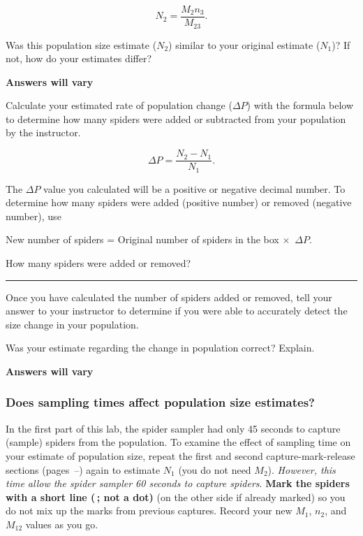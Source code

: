 \documentclass[12pt, hidelinks]{exam}
\begin{document}
\begin{questions}
\[ N_2 = \dfrac{M_2 n_3}{M_{23}}. \]


\question
Was this population size estimate ($N_2$) similar to your original
estimate ($N_1$)? If not, how do your estimates differ?

\ifprintanswers \textbf{Answers will vary} \fi \vspace*{3\baselineskip}

\question
Calculate your estimated rate of population change ($\Delta P$) with the formula below to determine
how many spiders were added or subtracted from your population by the
instructor. 

\[ \Delta P = \dfrac{N_2 - N_1}{N_1}. \]

The $\Delta P$ value you calculated will be a positive or negative decimal number. To determine how many spiders were added (positive number) or removed (negative number), use

New number of spiders = Original number of spiders in the box $\times$~$\Delta P$.

\bigskip

\question \label{ques:spider_change}
How many spiders were added or removed? \rule{0.75in}{0.4pt}


Once you have calculated the number of spiders added or removed, tell your answer to your
instructor to determine if you were able to accurately detect the size change
in your population.

\question
Was your estimate regarding the change in population correct? Explain.

\ifprintanswers \textbf{Answers will vary} \fi \vspace*{3\baselineskip}


\subsubsection*{Does sampling times affect population size estimates?}

In the first part of this lab, the spider sampler had only 45 seconds to
capture (sample) spiders from the population. To examine the effect of
sampling time on your estimate of population size, repeat the first and second 
capture-mark-release sections (pages~\pageref{sec:first_mark}–\pageref{sec:second_mark}) 
again to estimate $N_1$ (you do not need $M_{2}$).
\emph{However, this time allow the spider sampler 60 seconds to capture
spiders}. \textbf{Mark the spiders with a short line (\raisebox{2pt}{\rule{4mm}{1.5pt}}\,; not a dot)} (on the other side if already marked) so you do not mix up the marks from previous captures. Record your new $M_1$, $n_2$, and $M_{12}$ values as you go. \bigskip


\end{questions}
\end{document}
